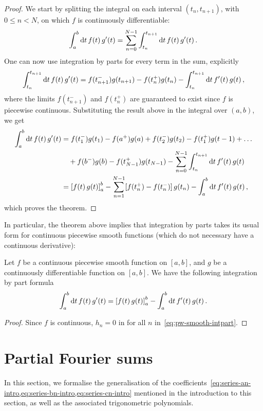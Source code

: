 \begin{proof}
  We start by splitting the integral on each interval $(t_n,t_{n+1})$, with $0\leq n<N$,
  on which $f$ is continuously differentiable:
  \begin{equation}
    \int_a^b\mathrm{d} t\, f(t)\,g'(t)
    =\sum_{n=0}^{N-1}\int_{t_n}^{t_{n+1}}\mathrm{d} t\, f(t)\,g'(t)\,.
  \end{equation}
  One can now use integration by parts for every term in the sum, explicitly
  \begin{equation}
    \int_{t_n}^{t_{n+1}}\mathrm{d} t\, f(t)\,g'(t)=
    f(t_{n+1}^-)g(t_{n+1})-f(t_n^+)g(t_n)-\int_{t_n}^{t_{n+1}}\mathrm{d} t\, f'(t)\,g(t)\,,
  \end{equation}
  where the limits $f(t_{n+1}^-)$ and $f(t_n^+)$ are guaranteed to exist since $f$ is
  piecewise continuous. Substituting the result above in the integral over $(a,b)$, we get
  \begin{align}
    \int_a^b\mathrm{d} t\, f(t)\,g'(t)&=f(t_1^-)g(t_1)-f(a^+)g(a)+f(t_2^-)g(t_2)
    -f(t_1^+)g(t-1)+\dots\notag\\
    &\quad+f(b^-)g(b)-f(t_{N-1}^+)g(t_{N-1})-
    \sum_{n=0}^{N-1}\int_{t_n}^{t_{n+1}}\mathrm{d} t\, f'(t)\,g(t)\\
    &=\left[f(t)\,g(t)\right]_a^b-\sum_{n=1}^{N-1}[f(t_n^+)-f(t_n^-)]\,g(t_n)
    -\int_a^b\mathrm{d} t\, f'(t)\,g(t)\,,
  \end{align}
  which proves the theorem.
\end{proof}
In particular, the theorem above implies that integration by parts takes its usual form
for continuous piecewise smooth functions (which do not necessary have a continuous
derivative):
\begin{corollary}
  Let $f$ be a continuous piecewise smooth function on $[a,b]$, and $g$ be a continuously
  differentiable function on $[a,b]$. We have the following integration by part formula
  \begin{equation}
    \int_a^b\mathrm{d} t\,f(t)\,g'(t)=\left[f(t)\,g(t)\right]_a^b
    -\int_a^b\mathrm{d} t\, f'(t)\,g(t)\,.
  \end{equation}
\end{corollary}
\begin{proof}
  Since $f$ is continuous, $h_n=0$ in for all $n$ in~\cref{eq:pw-smooth-intpart}.
\end{proof}

\section{Partial Fourier sums}
In this section, we formalise the generalisation of the
coefficients~\cref{eq:series-an-intro,eq:series-bn-intro,eq:series-cn-intro} mentioned in
the introduction to this section, as well as the associated trigonometric polynomials.
